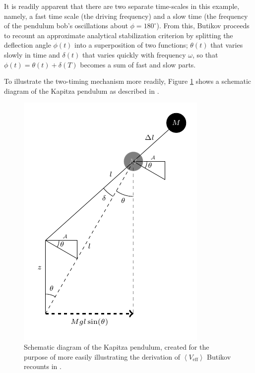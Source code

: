 \documentclass[12pt, letterpaper]{article}
\begin{document}
It is readily apparent that there are two separate time-scales in this example, namely, a fast time scale (the driving frequency) and a slow time (the frequency of the pendulum bob's oscillations about $\phi = 180^\circ$). From this, Butikov proceeds to recount an approximate analytical stabilization criterion by splitting the deflection angle $\phi(t)$ into a superposition of two functions; $\theta(t)$ that varies slowly in time and $\delta(t)$ that varies quickly with frequency $\omega$, so that $\phi(t) = \theta(t) + \delta(T)$ becomes a sum of fast and slow parts. 
\par To illustrate the two-timing mechanism more readily, Figure \ref{fig:ButikovKapitzaFig3bTopMoreDetailedGravity} shows a schematic diagram of the Kapitza pendulum as described in \cite{Butikov2017KapitzaS}.
\begin{figure}
    \centering
    \includegraphics[width=0.8\linewidth]{ButikovKapitzaFig3bTopMoreDetailedGravity.pdf}
    \caption{Schematic diagram of the Kapitza pendulum, created for the purpose of more easily illustrating the derivation of $\left<V_{\mathrm{eff}}\right>$ Butikov recounts in \cite{Butikov2017KapitzaS}.}
    \label{fig:ButikovKapitzaFig3bTopMoreDetailedGravity}
\end{figure}
\end{document}
